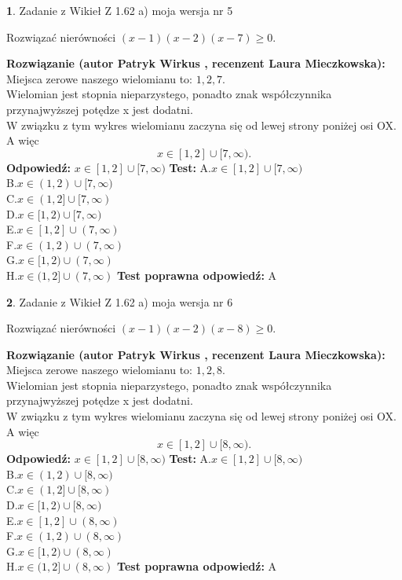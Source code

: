 \documentclass[12pt, a4paper]{article}
\theoremstyle{definition} %
\newtheorem{zad}{}
\newcommand{\zadStart}[1]{\begin{zad}#1\newline}
\newcommand{\zadStop}{\end{zad}}
\newcommand{\rozwStart}[2]{\noindent \textbf{Rozwiązanie (autor #1 , recenzent #2): }\newline}
\newcommand{\rozwStop}{\newline}
\newcommand{\odpStart}{\noindent \textbf{Odpowiedź:}\newline}
\newcommand{\odpStop}{\newline}
\newcommand{\testStart}{\noindent \textbf{Test:}\newline}
\newcommand{\testStop}{\newline}
\newcommand{\kluczStart}{\noindent \textbf{Test poprawna odpowiedź:}\newline}
\newcommand{\kluczStop}{\newline}
\begin{document}
\zadStart{Zadanie z Wikieł Z 1.62 a) moja wersja nr 5}

Rozwiązać nierówności $(x-1)(x-2)(x-7)\ge0$.
\zadStop
\rozwStart{Patryk Wirkus}{Laura Mieczkowska}
Miejsca zerowe naszego wielomianu to: $1, 2, 7$.\\
Wielomian jest stopnia nieparzystego, ponadto znak współczynnika przy\linebreak najwyższej potędze x jest dodatni.\\ W związku z tym wykres wielomianu zaczyna się od lewej strony poniżej osi OX. A więc $$x \in [1,2] \cup [7,\infty).$$
\rozwStop
\odpStart
$x \in [1,2] \cup [7,\infty)$
\odpStop
\testStart
A.$x \in [1,2] \cup [7,\infty)$\\
B.$x \in (1,2) \cup [7,\infty)$\\
C.$x \in (1,2] \cup [7,\infty)$\\
D.$x \in [1,2) \cup [7,\infty)$\\
E.$x \in [1,2] \cup (7,\infty)$\\
F.$x \in (1,2) \cup (7,\infty)$\\
G.$x \in [1,2) \cup (7,\infty)$\\
H.$x \in (1,2] \cup (7,\infty)$
\testStop
\kluczStart
A
\kluczStop



\zadStart{Zadanie z Wikieł Z 1.62 a) moja wersja nr 6}

Rozwiązać nierówności $(x-1)(x-2)(x-8)\ge0$.
\zadStop
\rozwStart{Patryk Wirkus}{Laura Mieczkowska}
Miejsca zerowe naszego wielomianu to: $1, 2, 8$.\\
Wielomian jest stopnia nieparzystego, ponadto znak współczynnika przy\linebreak najwyższej potędze x jest dodatni.\\ W związku z tym wykres wielomianu zaczyna się od lewej strony poniżej osi OX. A więc $$x \in [1,2] \cup [8,\infty).$$
\rozwStop
\odpStart
$x \in [1,2] \cup [8,\infty)$
\odpStop
\testStart
A.$x \in [1,2] \cup [8,\infty)$\\
B.$x \in (1,2) \cup [8,\infty)$\\
C.$x \in (1,2] \cup [8,\infty)$\\
D.$x \in [1,2) \cup [8,\infty)$\\
E.$x \in [1,2] \cup (8,\infty)$\\
F.$x \in (1,2) \cup (8,\infty)$\\
G.$x \in [1,2) \cup (8,\infty)$\\
H.$x \in (1,2] \cup (8,\infty)$
\testStop
\kluczStart
A
\kluczStop
\end{document}
